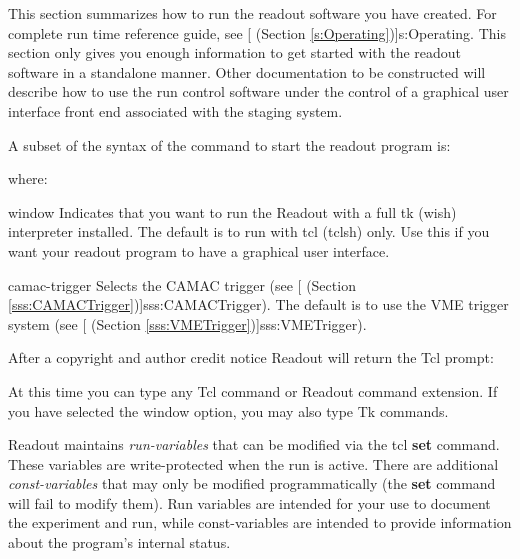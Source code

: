 
   This section summarizes how to run the readout software you have created.  For 
   complete run time reference guide, see
   [ (Section \ref{s:Operating})]{s:Operating}.
   This section only gives you enough information to get started with the readout software in
   a standalone manner.  Other documentation to be constructed will describe how to use the 
   run control software under the control of a graphical user interface front end associated with
   the staging system.

   A subset of the syntax of the command to start the readout program is:
   \begin{example}
    
   \end{example}
   where:
   \begin{description}
      \item{{\dash\dash}window} Indicates that you want to run the Readout with a full
	    tk (wish) interpreter installed.  The default is to run with tcl (tclsh)
	    only.  Use this if you want your readout program to have a graphical user
	    interface.
      \item{{\dash\dash}camac-trigger}   Selects the CAMAC trigger (see 
	 [ (Section \ref{sss:CAMACTrigger})]{sss:CAMACTrigger}). The 
	    default is to use the VME trigger system (see
	    [ (Section \ref{sss:VMETrigger})]{sss:VMETrigger}).
   \end{description}
   
   After a copyright and author credit notice Readout will return the Tcl prompt:
   \begin{example}
   \computer{\%}
   \end{example}
   
   At this time you can type any Tcl command or Readout command extension.  If you have
   selected the {\dash\dash}window option, you may also type Tk commands.
   
   Readout maintains {\em run-variables} that can be modified via the tcl {\bf set} command.  These
   variables are write-protected when the run is active.  There are additional 
   {\em const-variables} that 
   may only be modified programmatically (the {\bf set} command will fail to modify them).  
   Run variables are intended for your use to document the experiment and run, while
   const-variables are intended to provide information about the program's internal
   status.
   
